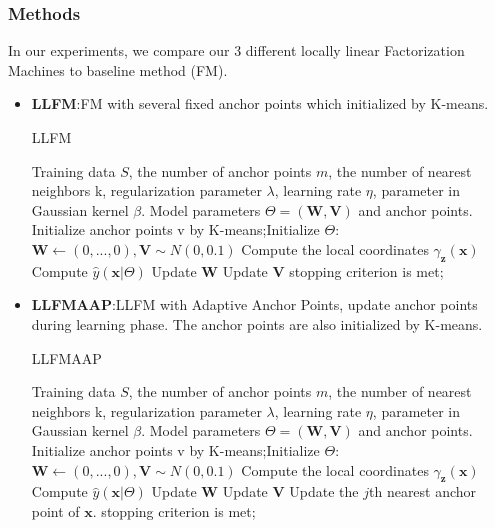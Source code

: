 \documentclass{article}
\begin{document}
\subsubsection{Methods}
In our experiments, we compare our 3 different locally linear Factorization Machines to baseline method (FM).
\begin{itemize}
	\item \textbf{LLFM}:FM with several fixed anchor points which initialized by K-means.
	\begin{algorithm}[H]
		\caption{LLFM}
		\begin{algorithmic}[1]
			\REQUIRE Training data $S$, the number of anchor points $m$, the number of nearest neighbors k, regularization parameter $\lambda$, learning rate $\eta$, parameter in Gaussian kernel $\beta$.
			\ENSURE Model parameters $\Theta = (\boldsymbol W, \boldsymbol V)$ and anchor points.
			\STATE Initialize anchor points v by K-means;Initialize $\Theta$:$\boldsymbol W\leftarrow(0,...,0),\boldsymbol V\sim N(0,0.1)$
			\REPEAT 
			\STATE Compute the local coordinates $\gamma_{\boldsymbol{z}}(\boldsymbol{x})$
			\STATE Compute $\hat{y}(\boldsymbol{x}|\Theta)$
			\STATE Update $\boldsymbol W$
			\STATE Update $\boldsymbol V$
			\ENDFOR
			\UNTIL stopping criterion is met;
		\end{algorithmic}
	\end{algorithm}
	\item \textbf{LLFMAAP}:LLFM with Adaptive Anchor Points, update anchor points during learning phase. The anchor points are also initialized by K-means.
	\begin{algorithm}[H]
		\caption{LLFMAAP}
		\begin{algorithmic}[1]
			\REQUIRE Training data $S$, the number of anchor points $m$, the number of nearest neighbors k, regularization parameter $\lambda$, learning rate $\eta$, parameter in Gaussian kernel $\beta$.
			\ENSURE Model parameters $\Theta = (\boldsymbol W, \boldsymbol V)$ and anchor points.
			\STATE Initialize anchor points v by K-means;Initialize $\Theta$:$\boldsymbol W\leftarrow(0,...,0),\boldsymbol V\sim N(0,0.1)$
			\REPEAT 
			\STATE Compute the local coordinates $\gamma_{\boldsymbol{z}}(\boldsymbol{x})$
			\STATE Compute $\hat{y}(\boldsymbol{x}|\Theta)$
			\STATE Update $\boldsymbol W$
			\STATE Update $\boldsymbol V$
			\STATE Update the $j$th nearest anchor point of $\boldsymbol{x}$.
			\ENDFOR
			\ENDFOR
			\UNTIL stopping criterion is met;
		\end{algorithmic}

\end{algorithm}
\end{itemize}
\end{document}
